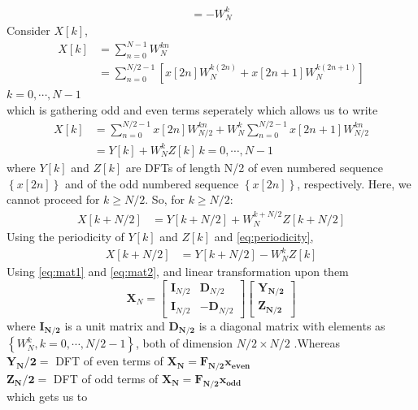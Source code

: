 \documentclass[journal,12pt,twocolumn]{IEEEtran}
\providecommand{\brak}[1]{\ensuremath{\left(#1\right)}}
\providecommand{\cbrak}[1]{\ensuremath{\left\{#1\right\}}}
\providecommand{\sbrak}[1]{\ensuremath{\left[#1\right]}}
\let\vec\mathbf
\numberwithin{equation}{section}
\renewcommand\thesection{\arabic{section}}
\begin{document}
\begin{enumerate}[label=\arabic*.,ref=\thesection.\theenumi]
\begin{align}
=-W_N^{k}
\end{align}
Consider $X\sbrak{k}$,
\begin{align}
X\sbrak{k}&=\sum_{n=0}^{N-1}W_N^{kn}\\
&=\sum_{n=0}^{N/2-1}\sbrak{x\sbrak{2n}W_N^{k\brak{2n}}+x\sbrak{2n+1}W_N^{k\brak{2n+1}}}
\end{align}
$k=0,\cdots,N-1$\\
which is gathering odd and even terms seperately
which allows us to write
\begin{align}
X\sbrak{k}&=\sum_{n=0}^{N/2-1}x\sbrak{2n}W_{N/2}^{kn}+W_N^k\sum_{n=0}^{N/2-1}x\sbrak{2n+1}W_{N/2}^{kn}\\
\label{eq:mat1}
&=Y\sbrak{k}+W_N^k Z\sbrak{k} \,k=0,\cdots,N-1
\end{align}
 where $Y\sbrak{k}$ and $Z\sbrak{k}$ are DFTs of length N/2 of even numbered sequence $\cbrak{x\sbrak{2n}}$ and of the odd numbered sequence $\cbrak{x\sbrak{2n}}$, respectively. Here, we cannot proceed for $k\ge N/2$. So, for $k \ge N/2:$
 \begin{align}
 X\sbrak{k+N/2}&=Y\sbrak{k+N/2}+W_N^{k+N/2} Z\sbrak{k+N/2}
 \end{align}
 Using the periodicity of $Y\sbrak{k}$ and $Z\sbrak{k}$ and \eqref{eq:periodicity},
 \begin{align}
 \label{eq:mat2}
 X\sbrak{k+N/2}&=Y\sbrak{k+N/2}-W_N^{k} Z\sbrak{k}
 \end{align}
 Using \eqref{eq:mat1} and \eqref{eq:mat2}, and linear transformation upon them
 \begin{equation}
 \label{eq:fmat}
\vec{X}_{N}=
\begin{bmatrix}
\vec{I}_{N/2} & \vec{D}_{N/2} \\
\vec{I}_{N/2} & -\vec{D}_{N/2}
\end{bmatrix}
\begin{bmatrix}
\vec{Y_{N/2}}\\\vec{Z_{N/2}}
\end{bmatrix}
\end{equation}
where $\vec{I_{N/2}}$ is a unit matrix and $\vec{D_{N/2}}$ is a diagonal matrix with elements as $\cbrak{W_N^{k},k=0,\cdots,N/2-1}$, both of dimension $N/2 \times N/2$ .Whereas \\
$\vec{Y_N/2}=$ DFT of even terms of $\vec{X_N}=\vec{F_{N/2}x_{even}}$\\
$\vec{Z_N/2}=$ DFT of odd terms of $\vec{X_N}=\vec{F_{N/2}x_{odd}}$\\
which gets us to \\
\begin{align}

\end{align}
\end{enumerate}
\end{document}
